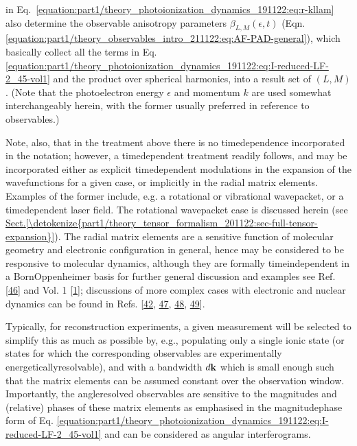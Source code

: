 \documentclass[letterpaper,table,10pt,english]{jupyterBook}
\begin{document}
in Eq. \eqref{equation:part1/theory_photoionization_dynamics_191122:eq:r-kllam} also determine the observable anisotropy
parameters \(\beta_{L,M}(\epsilon,t)\) (Eqn.
\eqref{equation:part1/theory_observables_intro_211122:eq:AF-PAD-general}), which basically collect all the terms in Eq. \eqref{equation:part1/theory_photoionization_dynamics_191122:eq:I-reduced-LF-2_45-vol1} and the product over spherical harmonics, into a result set of \((L,M)\). (Note that the photoelectron energy
\(\epsilon\) and momentum \(k\) are used somewhat interchangeably herein,
with the former usually preferred in reference to observables.)

\sphinxAtStartPar
Note, also, that in the treatment above there is no time\sphinxhyphen{}dependence
incorporated in the notation; however, a time\sphinxhyphen{}dependent treatment
readily follows, and may be incorporated either as explicit
time\sphinxhyphen{}dependent modulations in the expansion of the wavefunctions for a
given case, or implicitly in the radial matrix elements. Examples of the
former include, e.g. a rotational or vibrational wavepacket, or a
time\sphinxhyphen{}dependent laser field. The rotational wavepacket case is discussed
herein (see \hyperref[\detokenize{part1/theory_tensor_formalism_201122:sec-full-tensor-expansion}]{Sect.\@ \ref{\detokenize{part1/theory_tensor_formalism_201122:sec-full-tensor-expansion}}}). The radial matrix elements are
a sensitive function of molecular geometry and electronic configuration
in general, hence may be considered to be responsive to molecular
dynamics, although they are formally time\sphinxhyphen{}independent in a
Born\sphinxhyphen{}Oppenheimer basis \sphinxhyphen{} for further general discussion and examples see
Ref. {[}\hyperlink{cite.backmatter/bibliography:id809}{46}{]} and  Vol. 1 {[}\hyperlink{cite.backmatter/bibliography:id569}{1}{]}; discussions of more
complex cases with electronic and nuclear dynamics can be found in Refs.
{[}\hyperlink{cite.backmatter/bibliography:id735}{42}, \hyperlink{cite.backmatter/bibliography:id424}{47}, \hyperlink{cite.backmatter/bibliography:id758}{48}, \hyperlink{cite.backmatter/bibliography:id756}{49}{]}.

\sphinxAtStartPar
Typically, for reconstruction experiments, a given measurement will be
selected to simplify this as much as possible by, e.g., populating only
a single ionic state (or states for which the corresponding observables
are experimentally energetically\sphinxhyphen{}resolvable), and with a bandwidth
\(d\bf{k}\) which is small enough such that the matrix elements can be
assumed constant over the observation window. Importantly, the angle\sphinxhyphen{}resolved observables are
sensitive to the magnitudes and (relative) phases of these matrix
elements \sphinxhyphen{} as emphasised in the magnitude\sphinxhyphen{}phase form of Eq. \eqref{equation:part1/theory_photoionization_dynamics_191122:eq:I-reduced-LF-2_45-vol1} \sphinxhyphen{} and can be considered as angular interferograms.
\end{document}
